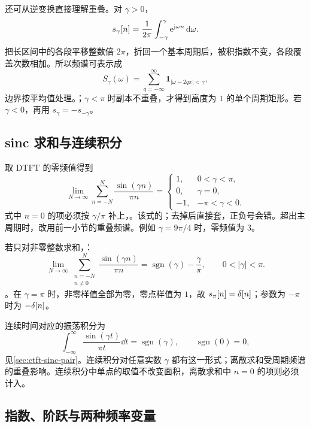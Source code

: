 还可从逆变换直接理解重叠。对 $\gamma>0$，
\[
  s_\gamma[n]=\frac{1}{2\pi}\int_{-\gamma}^{\gamma}
    \mathrm{e}^{\mathrm{j}\omega n}\mathop{}\!\mathrm{d}\omega.
\]
把长区间中的各段平移整数倍 $2\pi$，折回一个基本周期后，被积指数不变，各段覆盖次数相加。所以频谱可表示成
\[
  S_\gamma(\omega)=\sum_{q=-\infty}^{\infty}
    \mathbf 1_{|\omega-2q\pi|<\gamma},
\]
边界按平均值处理。；$\gamma<\pi$ 时副本不重叠，才得到高度为 $1$ 的单个周期矩形。若 $\gamma<0$，再用 $s_\gamma=-s_{-\gamma}$。

\subsection{sinc 求和与连续积分}

取 DTFT 的零频值得到
\begin{equation}
  \lim_{N\to\infty}\sum_{n=-N}^{N}
    \frac{\sin(\gamma n)}{\pi n}
  =\begin{cases}
    1,&0<\gamma<\pi,\\
    0,&\gamma=0,\\
    -1,&-\pi<\gamma<0.
  \end{cases}
  \label{eq:dtft-sinc-sum}
\end{equation}
式中 $n=0$ 的项必须按 $\gamma/\pi$ 补上，。该式的；去掉后直接套，正负号会错。超出主周期时，改用前一小节的重叠频谱。例如 $\gamma=9\pi/4$ 时，零频值为 $3$。

若只对非零整数求和，：
\begin{equation}
  \lim_{N\to\infty}\sum_{\substack{n=-N\\n\ne0}}^{N}
    \frac{\sin(\gamma n)}{\pi n}
  =\operatorname{sgn}(\gamma)-\frac{\gamma}{\pi},
  \qquad 0<|\gamma|<\pi.
  \label{eq:dtft-sinc-sum-without-zero}
\end{equation}
。在 $\gamma=\pi$ 时，非零样值全部为零，零点样值为 $1$，故 $s_\pi[n]=\delta[n]$；参数为 $-\pi$ 时为 $-\delta[n]$。

连续时间对应的振荡积分为
\[
  \int_{-\infty}^{\infty}\frac{\sin(\gamma t)}{\pi t}\dd t
  =\operatorname{sgn}(\gamma),\qquad \operatorname{sgn}(0)=0,
\]
见\cref{sec:ctft-sinc-pair}。连续积分对任意实数 $\gamma$ 都有这一形式；离散求和受周期频谱的重叠影响。连续积分中单点的取值不改变面积，离散求和中 $n=0$ 的项则必须计入。

\subsection{指数、阶跃与两种频率变量}

